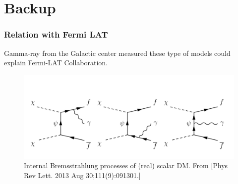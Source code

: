 \documentclass{beamer}
\begin{document}
\section{Backup}
\begin{frame}
\frametitle{Relation with Fermi LAT}

Gamma-ray from the Galactic center measured these type of models could explain Fermi-LAT Collaboration.

\begin{figure}
\centering
\includegraphics[scale=0.3]{pictures/Bremsstrahlung} 
\caption{Internal Bremsstrahlung processes of (real) scalar DM. From [Phys Rev Lett. 2013 Aug 30;111(9):091301.] }
\label{fig:Brem}
\end{figure}

\end{frame}
\end{document}
